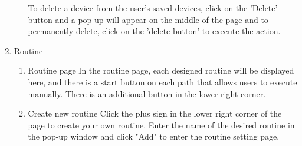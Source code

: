 \begin{enumerate}[label=\arabic*.]
\begin{enumerate}[label*={\arabic*.},ref=\theenumi.\arabic*]
                    To delete a device from the user's saved devices, click on the 'Delete' button and a pop up
                    will appear on the middle of the page and to permanently delete, click on the 'delete button' to execute the action. \\
          \end{enumerate}
          \clearpage
    \item {\large{Routine}}\\
          \begin{enumerate}[label*={\arabic*.},ref=\theenumi.\arabic*]
              \item Routine page
                    In the routine page, each designed routine will be displayed here, and there is a start button on each path that allows users to execute manually. There is an additional button in the lower right corner.\\
                    \newpage
              \item Create new routine
                    Click the plus sign in the lower right corner of the page to create your own routine. Enter the name of the desired routine in the pop-up window and click "Add" to enter the routine setting page.\\


\end{enumerate}
\end{enumerate}
